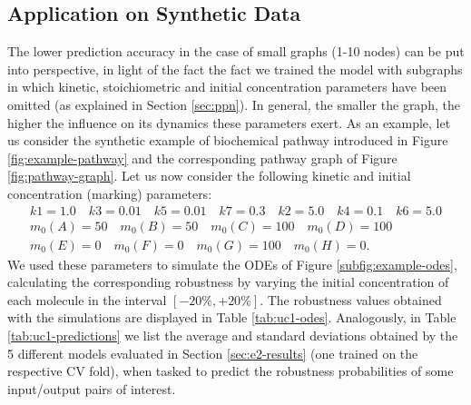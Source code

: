 \subsection{Application on Synthetic Data}
The lower prediction accuracy in the case of small graphs (1-10 nodes) can be put into perspective, in light of the fact the fact we trained the model with subgraphs in which kinetic, stoichiometric and initial concentration parameters have been omitted (as explained in Section \ref{sec:ppn}). In general, the smaller the graph, the higher the influence on its dynamics these parameters exert. As an example, let us consider the synthetic example of biochemical pathway introduced in Figure \ref{fig:example-pathway} and the corresponding pathway graph of Figure \ref{fig:pathway-graph}. Let us now consider the following kinetic and initial concentration (marking) parameters:
\begin{gather*}
  k1 = 1.0 \quad
  k3 = 0.01 \quad
  k5 = 0.01 \quad
  k7 = 0.3  \quad
  k2 = 5.0  \quad
  k4 = 0.1  \quad
  k6 = 5.0 \\
  m_0(A) = 50\quad
  m_0(B) = 50\quad
  m_0(C) = 100\quad
  m_0(D) = 100\\
  m_0(E) = 0\quad
  m_0(F) = 0\quad
  m_0(G) = 100\quad
  m_0(H) = 0.
\end{gather*}
We used these parameters to simulate the ODEs of Figure \ref{subfig:example-odes}, calculating the corresponding robustness by varying the initial concentration of each molecule in the interval $[-20\%,+20\%]$. The robustness values obtained with the simulations are displayed in Table \ref{tab:uc1-odes}. Analogously, in Table \ref{tab:uc1-predictions} we list the average and standard deviations obtained by the 5 different models evaluated in Section \ref{sec:e2-results} (one trained on the respective CV fold), when tasked to predict the robustness probabilities of some input/output pairs of interest.

